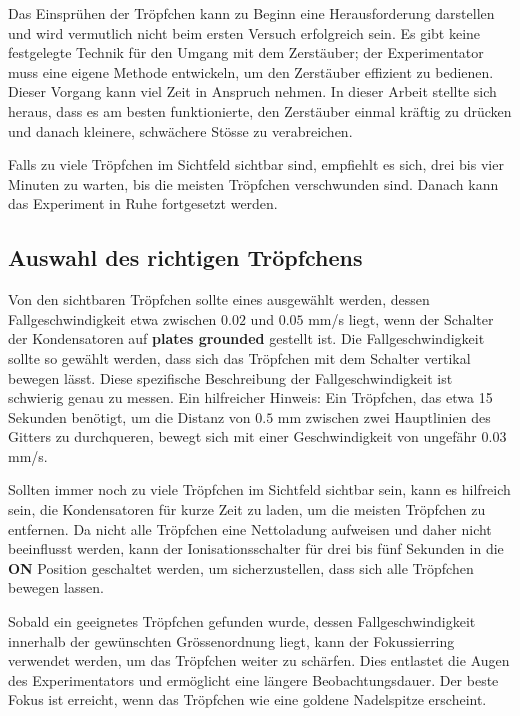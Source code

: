 Das Einsprühen der Tröpfchen kann zu Beginn eine Herausforderung darstellen und wird vermutlich nicht beim ersten Versuch erfolgreich sein. Es gibt keine festgelegte Technik für den Umgang mit dem Zerstäuber; der Experimentator muss eine eigene Methode entwickeln, um den Zerstäuber effizient zu bedienen. Dieser Vorgang kann viel Zeit in Anspruch nehmen. In dieser Arbeit stellte sich heraus, dass es am besten funktionierte, den Zerstäuber einmal kräftig zu drücken und danach kleinere, schwächere Stösse zu verabreichen.

Falls zu viele Tröpfchen im Sichtfeld sichtbar sind, empfiehlt es sich, drei bis vier Minuten zu warten, bis die meisten Tröpfchen verschwunden sind. Danach kann das Experiment in Ruhe fortgesetzt werden.

\subsection{Auswahl des richtigen Tröpfchens}\label{sub:auswahlTropfen}
Von den sichtbaren Tröpfchen sollte eines ausgewählt werden, dessen Fallgeschwindigkeit etwa zwischen $0.02$ und $0.05$ mm/s liegt, wenn der Schalter der Kondensatoren auf \textbf{plates grounded} gestellt ist. Die Fallgeschwindigkeit sollte so gewählt werden, dass sich das Tröpfchen mit dem Schalter vertikal bewegen lässt. Diese spezifische Beschreibung der Fallgeschwindigkeit ist schwierig genau zu messen. Ein hilfreicher Hinweis: Ein Tröpfchen, das etwa 15 Sekunden benötigt, um die Distanz von $0.5$ mm zwischen zwei Hauptlinien des Gitters zu durchqueren, bewegt sich mit einer Geschwindigkeit von ungefähr $0.03$ mm/s.

Sollten immer noch zu viele Tröpfchen im Sichtfeld sichtbar sein, kann es hilfreich sein, die Kondensatoren für kurze Zeit zu laden, um die meisten Tröpfchen zu entfernen. Da nicht alle Tröpfchen eine Nettoladung aufweisen und daher nicht beeinflusst werden, kann der Ionisationsschalter für drei bis fünf Sekunden in die \textbf{ON} Position geschaltet werden, um sicherzustellen, dass sich alle Tröpfchen bewegen lassen.

Sobald ein geeignetes Tröpfchen gefunden wurde, dessen Fallgeschwindigkeit innerhalb der gewünschten Grössenordnung liegt, kann der Fokussierring verwendet werden, um das Tröpfchen weiter zu schärfen. Dies entlastet die Augen des Experimentators und ermöglicht eine längere Beobachtungsdauer. Der beste Fokus ist erreicht, wenn das Tröpfchen wie eine goldene Nadelspitze erscheint.

